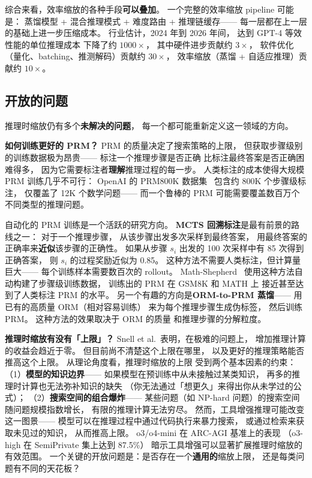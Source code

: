 综合来看，效率缩放的各种手段\textbf{可以叠加}。
一个完整的效率缩放 pipeline 可能是：
蒸馏模型 + 混合推理模式 + 难度路由 + 推理链缓存——
每一层都在上一层的基础上进一步压缩成本。
行业估计，2024 年到 2026 年间，
达到 GPT-4 等效性能的单位推理成本
下降了约 $1000\times$，
其中硬件进步贡献约 $3\times$，
软件优化（量化、batching、推测解码）贡献约 $30\times$，
效率缩放（蒸馏 + 自适应推理）贡献约 $10\times$。

\subsection{开放的问题}

推理时缩放仍有多个\textbf{未解决的问题}，
每一个都可能重新定义这一领域的方向。

\textbf{如何训练更好的 PRM？}
PRM 的质量决定了搜索策略的上限，
但获取步骤级别的训练数据极为昂贵——
标注一个推理步骤是否正确
比标注最终答案是否正确困难得多，
因为它需要标注者\textbf{理解}推理过程的每一步。
人类标注的成本使得大规模 PRM 训练几乎不可行：
OpenAI 的 PRM800K 数据集~\cite{lightman2024lets}
包含约 800K 个步骤级标注，
仅覆盖了 12K 个数学问题——
而一个鲁棒的 PRM 可能需要覆盖数百万个不同类型的推理问题。

自动化的 PRM 训练是一个活跃的研究方向。
\textbf{MCTS 回溯标注}是最有前景的路线之一：
对于一个推理步骤，
从该步骤出发多次采样到最终答案，
用最终答案的正确率来\textbf{近似}该步骤的正确性。
如果从步骤 $s_i$ 出发的 100 次采样中有 85 次得到正确答案，
则 $s_i$ 的过程奖励近似为 0.85。
这种方法不需要人类标注，但计算量巨大——
每个训练样本需要数百次的 rollout。
Math-Shepherd~\cite{wang2024mathshepherd}
使用这种方法自动构建了步骤级训练数据，
训练出的 PRM 在 GSM8K 和 MATH 上
接近甚至达到了人类标注 PRM 的水平。
另一个有趣的方向是\textbf{ORM-to-PRM 蒸馏}——
用已有的高质量 ORM（相对容易训练）
来为每个推理步骤生成伪标签，
然后训练 PRM。
这种方法的效果取决于 ORM 的质量
和推理步骤的分解粒度。

\textbf{推理时缩放有没有「上限」？}
Snell et al.\ 表明，在极难的问题上，
增加推理计算的收益会趋近于零。
但目前尚不清楚这个上限在哪里，
以及更好的推理策略能否推高这个上限。
从理论角度看，推理时缩放的上限
受到两个基本因素的约束：
（1）\textbf{模型的知识边界}——
如果模型在预训练中从未接触过某类知识，
再多的推理时计算也无法弥补知识的缺失
（你无法通过「想更久」来得出你从未学过的公式）；
（2）\textbf{搜索空间的组合爆炸}——
某些问题（如 NP-hard 问题）的搜索空间随问题规模指数增长，
有限的推理计算无法穷尽。
然而，工具增强推理可能改变这一图景——
模型可以在推理过程中通过代码执行来暴力搜索，
或通过检索来获取未见过的知识，
从而推高上限。
o3/o4-mini 在 ARC-AGI 基准上的表现
（o3-high 在 SemiPrivate 集上达到 87.5\%）
暗示工具增强可以显著扩展推理时缩放的有效范围。
一个关键的开放问题是：是否存在一个\textbf{通用的}缩放上限，
还是每类问题有不同的天花板？

